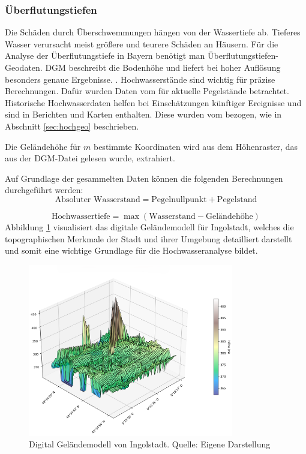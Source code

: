 \subsubsection{Überflutungstiefen}\label{sec:tief}
Die Schäden durch Überschwemmungen hängen von der Wassertiefe ab. Tieferes Wasser verursacht meist größere und teurere Schäden an Häusern. Für die Analyse der Überflutungstiefe in Bayern benötigt man Überflutungstiefen-Geodaten. \ac{DGM} beschreibt die Bodenhöhe und liefert bei hoher Auflösung besonders genaue Ergebnisse. \parencite{vermessungsverwaltung2019gelandemodell}. Hochwasserstände sind wichtig für präzise Berechnungen. Dafür wurden Daten vom \textcite{bayern2016hochwassernachrichtendienst} für aktuelle Pegelstände betrachtet. Historische Hochwasserdaten helfen bei Einschätzungen künftiger Ereignisse und sind in Berichten und Karten enthalten. Diese wurden vom \textcite{LfU_Bayern} bezogen, wie in Abschnitt \ref{sec:hochgeo} beschrieben.

Die Geländehöhe  für $m$ bestimmte Koordinaten wird aus dem Höhenraster, das aus der \ac{DGM}-Datei gelesen wurde, extrahiert.

Auf Grundlage der gesammelten Daten können die folgenden Berechnungen durchgeführt werden:
\begin{equation}
    \text{Absoluter Wasserstand} = \text{Pegelnullpunkt} + \text{Pegelstand}
\end{equation}

\begin{equation}
    \text{Hochwassertiefe} = \max \left( \text{Wasserstand} - \text{Geländehöhe} \right)
\end{equation}
 Abbildung \ref{fig:ingolstadt} visualisiert das digitale Geländemodell für Ingolstadt, welches die topographischen Merkmale der Stadt und ihrer Umgebung detailliert darstellt und somit eine wichtige Grundlage für die Hochwasseranalyse bildet.
\begin{figure}[!ht]
    \centering
    \includegraphics[width=0.8\textwidth]{figures/dgm_3d_wireframe_ingolstadt.png}
    \caption{Digital Geländemodell von Ingolstadt. Quelle: Eigene Darstellung}
    \label{fig:ingolstadt}
\end{figure}
\FloatBarrier